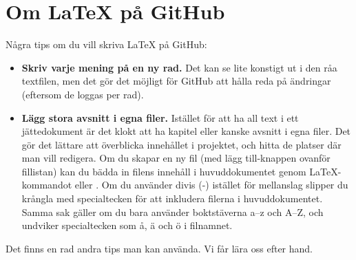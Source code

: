 \section{Om LaTeX på GitHub}

Några tips om du vill skriva LaTeX på GitHub:

\begin{itemize}

\item \textbf{Skriv varje mening på en ny rad.}
Det kan se lite konstigt ut i den råa textfilen, men det gör det möjligt för GitHub att hålla reda på ändringar (eftersom de loggas per rad).
\item \textbf{Lägg stora avsnitt i egna filer.}
Istället för att ha all text i ett jättedokument är det klokt att ha kapitel eller kanske avsnitt i egna filer.
Det gör det lättare att överblicka innehållet i projektet, och hitta de platser där man vill redigera.
Om du skapar en ny fil (med lägg till-knappen ovanför fillistan) kan du bädda in filens innehåll i huvuddokumentet genom LaTeX-kommandot \verb++ eller \verb++.
Om du använder divis (-) istället för mellanslag slipper du krångla med specialtecken för att inkludera filerna i huvuddokumentet.
Samma sak gäller om du bara använder boktstäverna a--z och A--Z, och undviker specialtecken som å, ä och ö i filnamnet.

\end{itemize}

Det finns en rad andra tips man kan använda. Vi får lära oss efter hand. 
